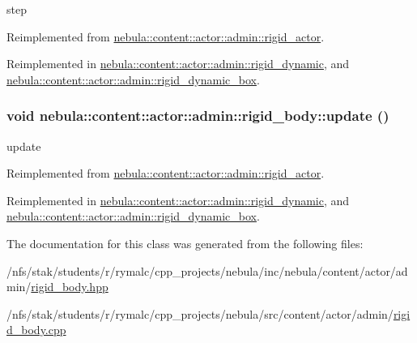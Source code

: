 step 

Reimplemented from \hyperlink{classnebula_1_1content_1_1actor_1_1admin_1_1rigid__actor_aba5200b2e542e3f0433c89ef026c5673}{nebula::content::actor::admin::rigid\_\-actor}.

Reimplemented in \hyperlink{classnebula_1_1content_1_1actor_1_1admin_1_1rigid__dynamic_ae5350e2820c0e00c36c663fc63a8b83c}{nebula::content::actor::admin::rigid\_\-dynamic}, and \hyperlink{classnebula_1_1content_1_1actor_1_1admin_1_1rigid__dynamic__box_a2989dba143de5dabded9ca32702cccaa}{nebula::content::actor::admin::rigid\_\-dynamic\_\-box}.\hypertarget{classnebula_1_1content_1_1actor_1_1admin_1_1rigid__body_aacabe8d617dd48c2ffec43edae75553d}{
\subsubsection[{update}]{\setlength{\rightskip}{0pt plus 5cm}void nebula::content::actor::admin::rigid\_\-body::update ()}}
\label{classnebula_1_1content_1_1actor_1_1admin_1_1rigid__body_aacabe8d617dd48c2ffec43edae75553d}


update 

Reimplemented from \hyperlink{classnebula_1_1content_1_1actor_1_1admin_1_1rigid__actor_a3c0adb150e7bfb43c209e6dc102253a5}{nebula::content::actor::admin::rigid\_\-actor}.

Reimplemented in \hyperlink{classnebula_1_1content_1_1actor_1_1admin_1_1rigid__dynamic_a2bf9e18773b7db87cb35fef56274405a}{nebula::content::actor::admin::rigid\_\-dynamic}, and \hyperlink{classnebula_1_1content_1_1actor_1_1admin_1_1rigid__dynamic__box_ad0c1ca664351042f80ede5ed0a5bba0a}{nebula::content::actor::admin::rigid\_\-dynamic\_\-box}.

The documentation for this class was generated from the following files:\begin{DoxyCompactItemize}
\item 
/nfs/stak/students/r/rymalc/cpp\_\-projects/nebula/inc/nebula/content/actor/admin/\hyperlink{admin_2rigid__body_8hpp}{rigid\_\-body.hpp}\item 
/nfs/stak/students/r/rymalc/cpp\_\-projects/nebula/src/content/actor/admin/\hyperlink{admin_2rigid__body_8cpp}{rigid\_\-body.cpp}\end{DoxyCompactItemize}
